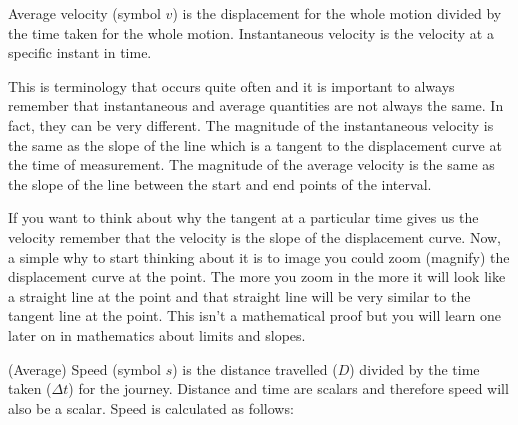       \label{m38791*id64500}Average velocity (symbol $v$) is the displacement for the whole motion divided by the time taken for the whole motion. Instantaneous velocity is the velocity at a specific instant in time.\par 
      \label{m38791*eip-536}This is terminology that occurs quite often and it is important to always remember that instantaneous and average quantities are not always the same. In fact, they can be very different. The magnitude of the instantaneous velocity is the same as the slope of the line which is a tangent to the displacement curve at the time of measurement. The magnitude of the average velocity is the same as the slope of the line between the start and end points of the interval. \par \label{m38791*eip-668}If you want to think about why the tangent at a particular time gives us the velocity remember that the velocity is the slope of the displacement curve. Now, a simple why to start thinking about it is to image you could zoom (magnify) the displacement curve at the point. The more you zoom in the more it will look like a straight line at the point and that straight line will be very similar to the tangent line at the point. This isn't a mathematical proof but you will learn one later on in mathematics about limits and slopes. \par \label{m38791*id64514}(Average) Speed (symbol $s$) is the distance travelled ($D$) divided by the time taken ($\Delta t$) for the journey. Distance and time are scalars and therefore speed will also be a scalar. Speed is calculated as follows:\par 
      \label{m38791*id64549}\nopagebreak\noindent{}
        
